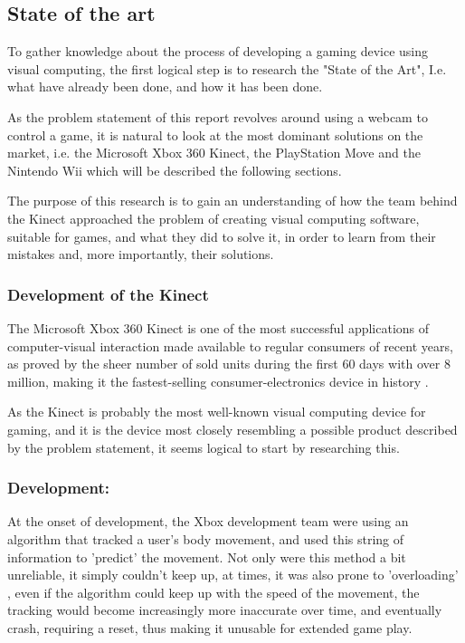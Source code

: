\subsection{State of the art}
To gather knowledge about the process of developing a gaming device using visual computing, the first logical step is to research the "State of the Art", I.e. what have already been done, and how it has been done.

As the problem statement of this report revolves around using a webcam to control a game, it is natural to look at the most dominant solutions on the market, i.e. the Microsoft Xbox 360 Kinect, the PlayStation Move and the Nintendo Wii which will be described the following sections.

The purpose of this research is to gain an understanding of how the team behind the Kinect approached the problem of creating visual computing software, suitable for games, and what they did to solve it, in order to learn from their mistakes and, more importantly, their solutions.

\subsubsection{Development of the Kinect}
The Microsoft Xbox 360 Kinect is one of the most successful applications of computer-visual interaction made available to regular consumers of recent years, as proved by the sheer number of sold units during the first 60 days with over 8 million, making it the fastest-selling consumer-electronics device in history \parencite{Knies}.

As the Kinect is probably the most well-known visual computing device for gaming, and it is the device most closely resembling a possible product described by the problem statement, it seems logical to start by researching this.

\subsubsection*{Development:}
At the onset of development, the Xbox development team were using an algorithm that tracked a user's body movement, and used this string of information to 'predict' the movement. Not only were this method a bit unreliable, it simply couldn't keep up, at times, it was also prone to 'overloading' \parencite{Knies}, even if the algorithm could keep up with the speed of the movement, the tracking would become increasingly more inaccurate over time, and eventually crash, requiring a reset, thus making it unusable for extended game play.

